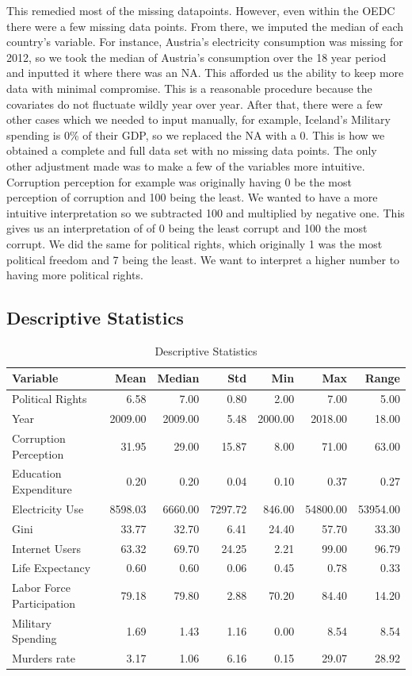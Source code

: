 \documentclass[
  english,
  man,floatsintext]{apa6}
\begin{document}
This remedied most of the missing datapoints. However, even within the OEDC there were a few missing data points. From there, we imputed the median of each country's variable. For instance, Austria's electricity consumption was missing for 2012, so we took the median of Austria's consumption over the 18 year period and inputted it where there was an NA. This afforded us the ability to keep more data with minimal compromise. This is a reasonable procedure because the covariates do not fluctuate wildly year over year. After that, there were a few other cases which we needed to input manually, for example, Iceland's Military spending is 0\% of their GDP, so we replaced the NA with a 0. This is how we obtained a complete and full data set with no missing data points. The only other adjustment made was to make a few of the variables more intuitive. Corruption perception for example was originally having 0 be the most perception of corruption and 100 being the least. We wanted to have a more intuitive interpretation so we subtracted 100 and multiplied by negative one. This gives us an interpretation of of 0 being the least corrupt and 100 the most corrupt. We did the same for political rights, which originally 1 was the most political freedom and 7 being the least. We want to interpret a higher number to having more political rights.
\newpage  

\hypertarget{descriptive-statistics}{%
\subsection{Descriptive Statistics}\label{descriptive-statistics}}

\begin{longtable}[t]{lrrrrrr}
\caption{\label{tab:unnamed-chunk-2}Descriptive Statistics}\\
\toprule
Variable & Mean & Median & Std & Min & Max & Range\\
\midrule
Political Rights & 6.58 & 7.00 & 0.80 & 2.00 & 7.00 & 5.00\\
Year & 2009.00 & 2009.00 & 5.48 & 2000.00 & 2018.00 & 18.00\\
Corruption Perception & 31.95 & 29.00 & 15.87 & 8.00 & 71.00 & 63.00\\
Education Expenditure & 0.20 & 0.20 & 0.04 & 0.10 & 0.37 & 0.27\\
Electricity Use & 8598.03 & 6660.00 & 7297.72 & 846.00 & 54800.00 & 53954.00\\
\addlinespace
Gini & 33.77 & 32.70 & 6.41 & 24.40 & 57.70 & 33.30\\
Internet Users & 63.32 & 69.70 & 24.25 & 2.21 & 99.00 & 96.79\\
Life Expectancy & 0.60 & 0.60 & 0.06 & 0.45 & 0.78 & 0.33\\
Labor Force Participation & 79.18 & 79.80 & 2.88 & 70.20 & 84.40 & 14.20\\
Military Spending & 1.69 & 1.43 & 1.16 & 0.00 & 8.54 & 8.54\\
\addlinespace
Murders rate & 3.17 & 1.06 & 6.16 & 0.15 & 29.07 & 28.92\\
\bottomrule
\end{longtable}
\end{document}
